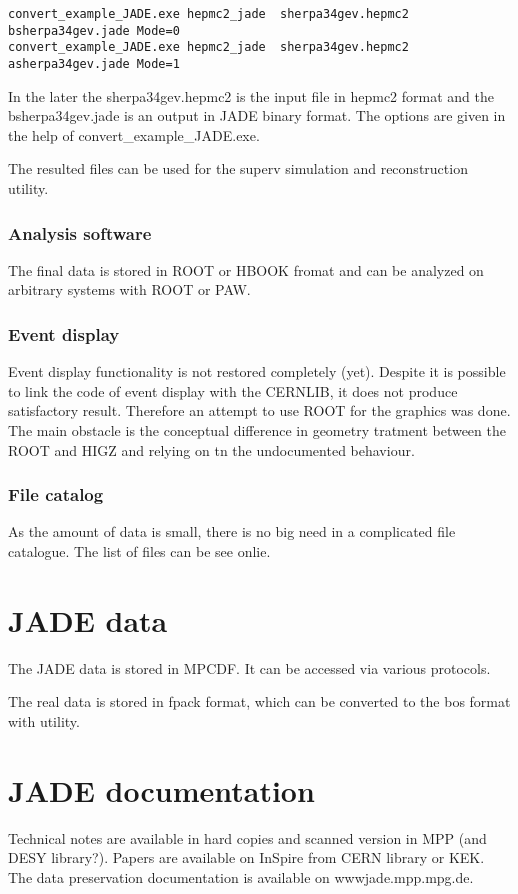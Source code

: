 \begin{Verbatim}[fontsize=\tiny]
convert_example_JADE.exe hepmc2_jade  sherpa34gev.hepmc2   bsherpa34gev.jade Mode=0
convert_example_JADE.exe hepmc2_jade  sherpa34gev.hepmc2   asherpa34gev.jade Mode=1
\end{Verbatim}
In the later the sherpa34gev.hepmc2 is the input file in hepmc2 format and the bsherpa34gev.jade is an output in JADE binary format.
The options are given in the help of convert\_example\_JADE.exe.

The resulted files can be used for the superv simulation and reconstruction utility.
\subsubsection{Analysis software}
The final  data  is stored in ROOT or HBOOK fromat  and can be analyzed on arbitrary systems with ROOT or PAW.

\subsubsection{Event display}
Event display functionality is not restored completely (yet).
Despite it is possible to link the  code of event display with the CERNLIB,
it does not produce satisfactory result.
Therefore an attempt to use ROOT for the graphics was done.
The main obstacle is the conceptual difference in geometry tratment between 
the ROOT and HIGZ and relying on tn the undocumented behaviour.



\subsubsection{File catalog}
As the amount of data is small, there is no big need in a complicated file catalogue.
The list of files can be see onlie. 


\section{JADE data}
The JADE data is stored in MPCDF.
It can be accessed via various protocols.

The real data is stored in fpack format, which can be converted to the bos format with utility.

\section{JADE documentation}
Technical notes are available in hard copies and scanned version in MPP (and DESY library?).
Papers are available on InSpire from CERN library or KEK.
The data preservation documentation is available on wwwjade.mpp.mpg.de.
